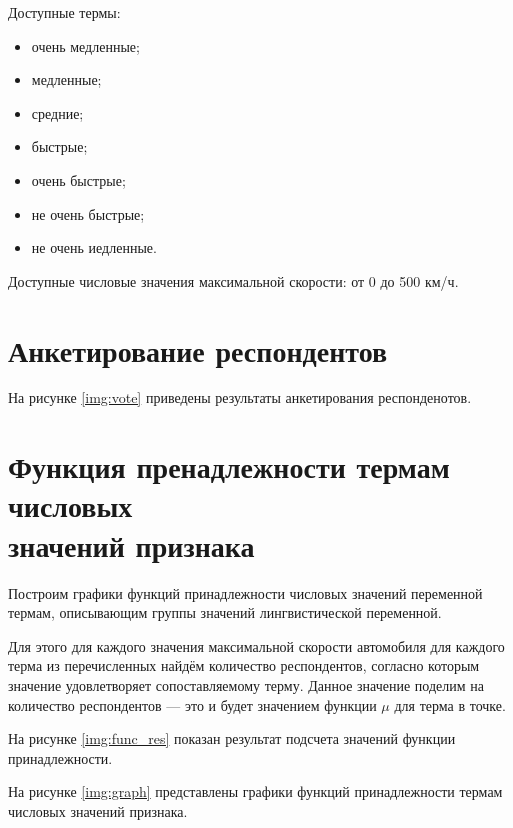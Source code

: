 Доступные термы:
\begin{itemize}[label=---]
    \item очень медленные;
    \item медленные;
    \item средние;
    \item быстрые;
    \item очень быстрые;
    \item не очень быстрые;
    \item не очень иедленные.
\end{itemize}

Доступные числовые значения максимальной скорости: от 0 до 500 км/ч.

\section{Анкетирование респондентов}

На рисунке \ref{img:vote} приведены результаты анкетирования респонденотов.

\FloatBarrier

\section{Функция пренадлежности термам числовых \\значений признака}

Построим графики функций принадлежности числовых значений переменной термам, описывающим группы значений лингвистической переменной.

Для этого для каждого значения максимальной скорости автомобиля для каждого терма из перечисленных найдём количество респондентов, согласно которым значение удовлетворяет сопоставляемому терму.
Данное значение поделим на количество респондентов --- это и будет значением функции $\mu$ для терма в точке.

На рисунке \ref{img:func_res} показан результат подсчета значений функции принадлежности.

\FloatBarrier

На рисунке \ref{img:graph} представлены графики функций принадлежности термам числовых значений признака.
